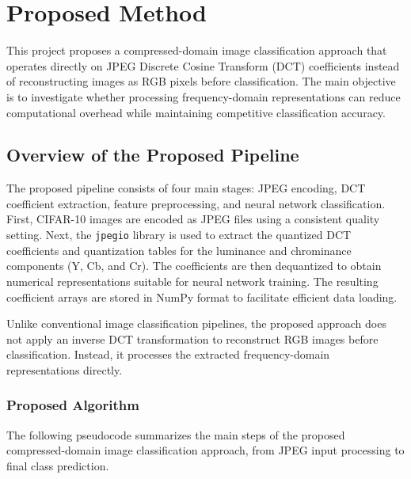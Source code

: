 \documentclass[11pt]{article}
\begin{document}
\section{Proposed Method}
\label{sec:method}

This project proposes a compressed-domain image classification approach that
operates directly on JPEG Discrete Cosine Transform (DCT) coefficients instead
of reconstructing images as RGB pixels before classification. The main objective
is to investigate whether processing frequency-domain representations can reduce
computational overhead while maintaining competitive classification accuracy.

\subsection{Overview of the Proposed Pipeline}

The proposed pipeline consists of four main stages: JPEG encoding, DCT
coefficient extraction, feature preprocessing, and neural network
classification. First, CIFAR-10 images are encoded as JPEG files using a
consistent quality setting. Next, the \texttt{jpegio} library is used to
extract the quantized DCT coefficients and quantization tables for the
luminance and chrominance components (Y, Cb, and Cr). The coefficients are
then dequantized to obtain numerical representations suitable
for neural network training. The resulting coefficient arrays are stored in
NumPy format to facilitate efficient data loading.

Unlike conventional image classification pipelines, the proposed approach
does not apply an inverse DCT transformation to reconstruct RGB images before
classification. Instead, it processes the extracted frequency-domain
representations directly.

\subsubsection{Proposed Algorithm}

The following pseudocode summarizes the main steps of the proposed
compressed-domain image classification approach, from JPEG input
processing to final class prediction.
\end{document}
